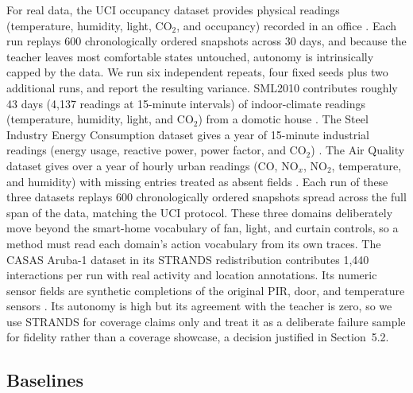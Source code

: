 \documentclass[review]{elsarticle}
\begin{document}
For real data, the UCI occupancy dataset provides physical readings
(temperature, humidity, light, CO$_2$, and occupancy) recorded in an office
\cite{28}. Each run replays 600 chronologically ordered snapshots across 30
days, and because the teacher leaves most comfortable states untouched,
autonomy is intrinsically capped by the data. We run six independent repeats,
four fixed seeds plus two additional runs, and report the resulting variance.
SML2010 contributes roughly 43 days (4,137 readings at 15-minute intervals) of indoor-climate readings
(temperature, humidity, light, and CO$_2$) from a domotic house \cite{33}.
The Steel Industry Energy Consumption dataset gives a year of 15-minute
industrial readings (energy usage, reactive power, power factor, and CO$_2$)
\cite{34}. The Air Quality dataset gives over a year of hourly urban readings
(CO, NO$_x$, NO$_2$, temperature, and humidity) with missing entries treated
as absent fields \cite{35}. Each run of these three datasets replays 600
chronologically ordered snapshots spread across the full span of the data,
matching the UCI protocol. These three domains deliberately move beyond the
smart-home
vocabulary of fan, light, and curtain controls, so a method must read each
domain's action vocabulary from its own traces. The CASAS Aruba-1 dataset in
its STRANDS redistribution contributes 1,440 interactions per run with real
activity and location annotations. Its numeric sensor fields are synthetic
completions of the original PIR, door, and temperature sensors \cite{29}. Its
autonomy is high but its agreement with the teacher is zero, so we use
STRANDS for coverage claims only and treat it as a deliberate failure sample
for fidelity rather than a coverage showcase, a decision justified in
Section~5.2.

\subsection{Baselines}
\end{document}
